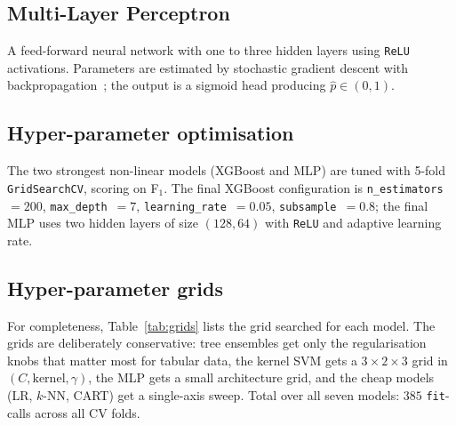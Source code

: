 \documentclass[conference]{IEEEtran}
\begin{document}
\subsection{Multi-Layer Perceptron}
A feed-forward neural network with one to three hidden layers using
\texttt{ReLU} activations. Parameters are estimated by stochastic
gradient descent with backpropagation~\cite{rumelhart1986learning}; the
output is a sigmoid head producing $\hat p \in (0,1)$.

\subsection{Hyper-parameter optimisation}
The two strongest non-linear models (XGBoost and MLP) are tuned with
5-fold \texttt{GridSearchCV}, scoring on F$_1$. The final XGBoost
configuration is
\texttt{n\_estimators}~$=200$, \texttt{max\_depth}~$=7$,
\texttt{learning\_rate}~$=0.05$, \texttt{subsample}~$=0.8$;
the final MLP uses two hidden layers of size $(128, 64)$ with
\texttt{ReLU} and adaptive learning rate.

\subsection{Hyper-parameter grids}
For completeness, Table~\ref{tab:grids} lists the grid searched
for each model. The grids are deliberately conservative: tree
ensembles get only the regularisation knobs that matter most for
tabular data, the kernel SVM gets a $3 \times 2 \times 3$ grid in
$(C, \mathrm{kernel}, \gamma)$, the MLP gets a small architecture
grid, and the cheap models (LR, $k$-NN, CART) get a single-axis
sweep. Total over all seven models: $385$ \texttt{fit}-calls
across all CV folds.
\end{document}
